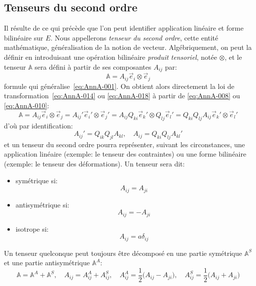 \subsection{Tenseurs du second ordre}
Il résulte de ce qui précède que l'on peut identifier application linéaire et forme bilinéaire sur $E$.
Nous appellerons \emph{tenseur du second ordre}, cette entité mathématique, généralisation de la notion de vecteur.
Algébriquement, on peut la définir en introduisant une opération bilinéaire \emph{produit tensoriel}, notée $\otimes$, et le tenseur $\mathbb{A}$ sera défini à partir de ses composantes $A_{ij}$ par:
\begin{equation}
    \mathbb{A} = A_{ij} \vec{e}_i \otimes \vec{e}_j
    \label{eq:AnnA-019}
\end{equation}
formule qui généralise~\eqref{eq:AnnA-001}.
On obtient alors directement la loi de transformation~\eqref{eq:AnnA-014} ou \eqref{eq:AnnA-018} à partir de \eqref{eq:AnnA-008} ou \eqref{eq:AnnA-010}:
\begin{equation}
    \mathbb{A} = A_{ij} \vec{e}_i \otimes \vec{e}_j = A_{ij}' \vec{e}_i{}' \otimes \vec{e}_j{}'= A_{ij} Q_{ki} \vec{e}_k{}' \otimes Q_{lj} \vec{e}_l{}'
    = Q_{ki} Q_{lj} A_{ij} \vec{e}_k{}' \otimes \vec{e}_l{}'
\end{equation}
d'où par identification:
\begin{equation}
    A_{ij}' = Q_{ik} Q_{jl} A_{kl}, \quad A_{ij} = Q_{ki} Q_{lj} A_{kl}'
    \label{eq:AnnA-020}
\end{equation}
et un tenseur du second ordre pourra représenter, suivant les circonstances, une application linéaire (exemple: le tenseur des contraintes) ou une forme bilinéaire (exemple: le tenseur des déformations).
Un tenseur sera dit:
\begin{itemize}
 \item symétrique si:
\begin{equation}
    A_{ij} = A_{ji}
    \label{eq:AnnA-021}
\end{equation}
\item antisymétrique si:
\begin{equation}
    A_{ij} = - A_{ji}
    \label{eq:AnnA-022}
\end{equation}
\item isotrope si:
\begin{equation}
    A_{ij} = a \delta_{ij}
    \label{eq:AnnA-0123}
\end{equation}
\end{itemize}
Un tenseur quelconque peut toujours être décomposé en une partie symétrique $\mathbb{A}^S$ et une partie antisymétrique $\mathbb{A}^A$:
\begin{equation}
        \mathbb{A} = \mathbb{A}^A + \mathbb{A}^S, \quad A_{ij} = A_{ij}^A + A_{ij}^S,\quad
        A_{ij}^A = \frac{1}{2} \bigl( A_{ij} - A_{ji} \bigr), \quad A_{ij}^S = \frac{1}{2} \bigl( A_{ij} + A_{ji} \bigr)
    \label{eq:AnnA-024}
\end{equation}
